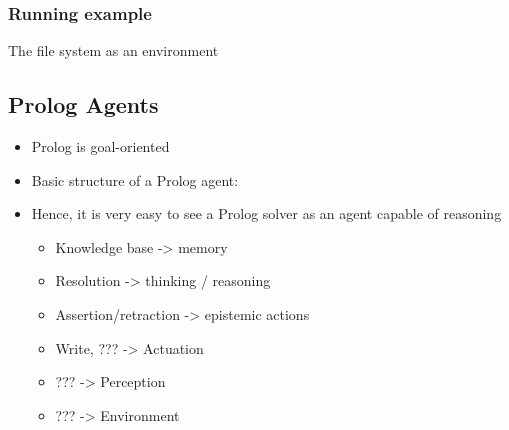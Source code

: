
\hypertarget{running-example}{%
\subsubsection{Running example}\label{running-example}}

The file system as an environment



\hypertarget{prolog-agents}{%
\subsection{Prolog Agents}\label{prolog-agents}}

\begin{itemize}
\item
  Prolog is goal-oriented
\item
  Basic structure of a Prolog agent:

\begin{Shaded}
\begin{Highlighting}[]
\NormalTok{) }\KeywordTok{:{-}} 
\NormalTok{)}\KeywordTok{,}
 \NormalTok{ )}\KeywordTok{,} 
\NormalTok{)}

\NormalTok{) }\KeywordTok{:{-}} \NormalTok{(}\StringTok{\textquotesingle{}}\StringTok{\textquotesingle{}}\NormalTok{)}\KeywordTok{,} \NormalTok{(}\NormalTok{)}\KeywordTok{,} 
\end{Highlighting}
\end{Shaded}
\item
  Hence, it is very easy to see a Prolog solver as an agent capable of
  reasoning

  \begin{itemize}
  \tightlist
  \item
    Knowledge base -\textgreater{} memory
  \item
    Resolution -\textgreater{} thinking / reasoning
  \item
    Assertion/retraction -\textgreater{} epistemic actions
  \item
    Write, ??? -\textgreater{} Actuation
  \item
    ??? -\textgreater{} Perception
  \item
    ??? -\textgreater{} Environment
  \end{itemize}
\end{itemize}


